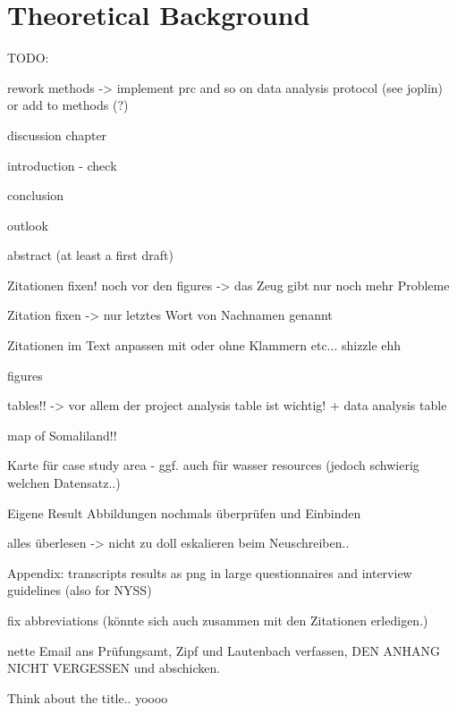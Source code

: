 
\chapter{Theoretical Background} %

\label{ChapterX} %


TODO:

rework methods -> implement prc and so on
data analysis protocol (see joplin) or add to methods (?)

discussion chapter

introduction - check

conclusion

outlook

abstract (at least a first draft)

Zitationen fixen! noch vor den figures -> das Zeug gibt nur noch mehr Probleme

Zitation fixen -> nur letztes Wort von Nachnamen genannt

Zitationen im Text anpassen mit oder ohne Klammern etc... shizzle ehh

figures

tables!! -> vor allem der project analysis table ist wichtig! + data analysis table

map of Somaliland!!

Karte für case study area - ggf. auch für wasser resources (jedoch schwierig welchen Datensatz..)

Eigene Result Abbildungen nochmals überprüfen und Einbinden

alles überlesen -> nicht zu doll eskalieren beim Neuschreiben..

Appendix:
transcripts
results as png in large
questionnaires and interview guidelines (also for NYSS)

fix abbreviations (könnte sich auch zusammen mit den Zitationen erledigen.)

nette Email ans Prüfungsamt, Zipf und Lautenbach verfassen, DEN ANHANG NICHT VERGESSEN und abschicken.

Think about the title.. yoooo

